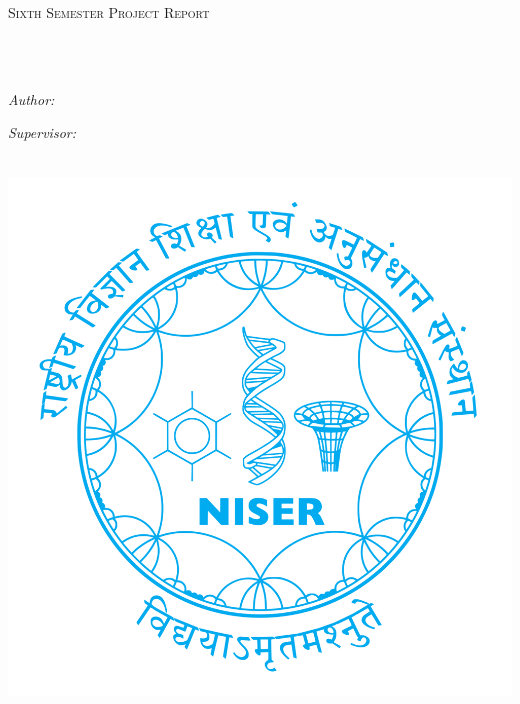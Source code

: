 \documentclass[11pt,oneside,english,singlespacing,headsepline]{thesis}
\author{Ashish \textsc{Panigrahi}}
\begin{document}
\frontmatter

\pagestyle{plain}

\begin{titlepage}
\begin{center}

\vspace*{.06\textheight}
{\scshape\LARGE \univname\par}\vspace{1.5cm}
\textsc{\Large Sixth Semester Project Report}\\[0.5cm]

\HRule \\[0.4cm]
{\huge \bfseries \ttitle\par}\vspace{0.4cm}
\HRule \\[1.5cm]

\begin{minipage}[t]{0.4\textwidth}
\begin{flushleft} \large
\emph{Author:}\\
{\authorname}
\end{flushleft}
\end{minipage}
\begin{minipage}[t]{0.4\textwidth}
\begin{flushright} \large
\emph{Supervisor:} \\
{\supname}
\end{flushright}
\end{minipage}\\[2cm]

\includegraphics[scale=0.1]{niser-logo.png}


\end{center}
\end{titlepage}
\end{document}
